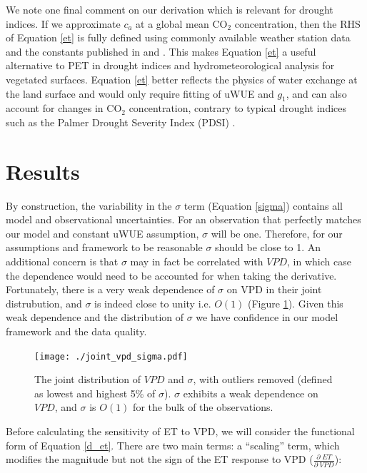 \documentclass[draft,linenumbers]{agujournal}
\begin{document}
We note one final comment on our derivation which is relevant for drought indices. If we approximate $c_a$ at a global mean CO$_2$ concentration, then the RHS of Equation \ref{et} is fully defined using commonly available weather station data and the constants published in \citet{Zhou_2015} and \citet{Lin_2015}. This makes Equation \ref{et} a useful alternative to PET in drought indices and hydrometeorological analysis for vegetated surfaces. Equation \ref{et} better reflects the physics of water exchange at the land surface and would only require fitting of uWUE and $g_1$, and can also account for changes in CO$_2$ concentration, contrary to typical drought indices such as the Palmer Drought Severity Index (PDSI) \citep{Swann_2016}.




\section{Results}
\label{results}

By construction, the variability in the $\sigma$ term (Equation \ref{sigma}) contains all model and observational uncertainties. For an observation that perfectly matches our model and constant uWUE assumption, $\sigma$ will be one. Therefore, for our assumptions and framework to be reasonable $\sigma$ should be close to 1. An additional concern is that $\sigma$ may in fact be correlated with $VPD$, in which case the dependence would need to be accounted for when taking the derivative. Fortunately, there is a very weak dependence of $\sigma$ on VPD in their joint distrubution, and $\sigma$ is indeed close to unity i.e. $O(1)$ (Figure \ref{joint_vpd_sigma}). Given this weak dependence and the distribution of $\sigma$ we have confidence in our model framework and the data quality.

\begin{figure}
\centering
\texttt{[image: ./joint\_vpd\_sigma.pdf]}
\caption{The joint distribution of $VPD$ and $\sigma$, with outliers removed (defined as lowest and highest 5\% of $\sigma$). $\sigma$ exhibits a weak dependence on $VPD$, and $\sigma$ is $O(1)$ for the bulk of the observations.}
\label{joint_vpd_sigma}
\end{figure}

Before calculating the sensitivity of ET to VPD, we will consider the functional form of Equation \ref{d_et}. There are two main terms: a ``scaling'' term, which modifies the magnitude but not the sign of the ET response to VPD  ($\frac{\partial \; ET}{\partial \; VPD}$):
\end{document}
